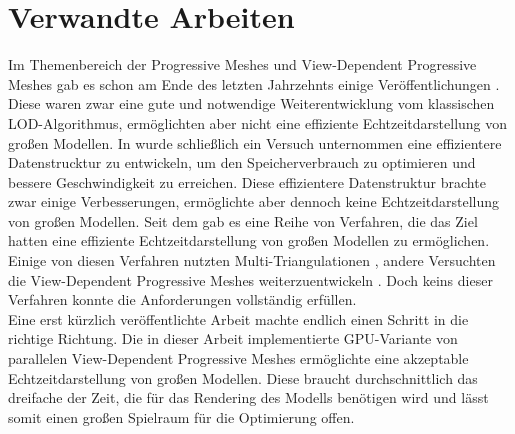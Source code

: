 \section{Verwandte Arbeiten}
Im  Themenbereich der Progressive Meshes und View-Dependent Progressive Meshes gab es schon am Ende des letzten Jahrzehnts einige  Veröffentlichungen \cite{bib:hoppePM, bib:hoppeVPM}.  Diese waren zwar eine gute und notwendige Weiterentwicklung vom klassischen LOD-Algorithmus, ermöglichten aber nicht eine effiziente Echtzeitdarstellung von großen Modellen. In \cite{bib:efPM} wurde schließlich ein Versuch unternommen eine effizientere Datenstrucktur zu entwickeln, um den Speicherverbrauch zu optimieren und bessere Geschwindigkeit zu erreichen. Diese effizientere Datenstruktur brachte zwar einige Verbesserungen, ermöglichte aber dennoch keine  Echtzeitdarstellung von großen Modellen. 
Seit dem gab es eine Reihe von Verfahren, die das Ziel hatten eine effiziente Echtzeitdarstellung von großen Modellen zu ermöglichen. Einige von diesen Verfahren nutzten Multi-Triangulationen \cite{bib:DFMP98}, andere Versuchten die  View-Dependent Progressive Meshes weiterzuentwickeln \cite{bib:PAJ01, bib:PD04 ,bib:ESV99}. Doch keins dieser Verfahren konnte die Anforderungen vollständig erfüllen.\\
Eine erst kürzlich veröffentlichte Arbeit \cite{bib:Hoppe2009} machte endlich einen Schritt in die richtige Richtung. Die in dieser Arbeit implementierte GPU-Variante von  parallelen View-Dependent Progressive Meshes ermöglichte eine akzeptable Echtzeitdarstellung von großen Modellen. Diese braucht durchschnittlich das dreifache der Zeit, die für das Rendering des  Modells benötigen wird und lässt somit einen großen Spielraum für die Optimierung offen.  

 
